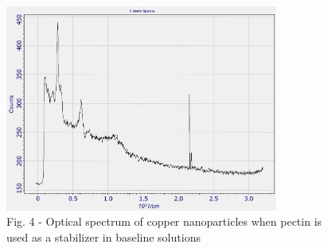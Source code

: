 \begin{figure}[H]
	\centering
	\includegraphics[width=0.8\textwidth]{assets/16}
	\caption*{Fig. 4 - Optical spectrum of copper nanoparticles when pectin is used as a stabilizer in baseline solutions}
\end{figure}

